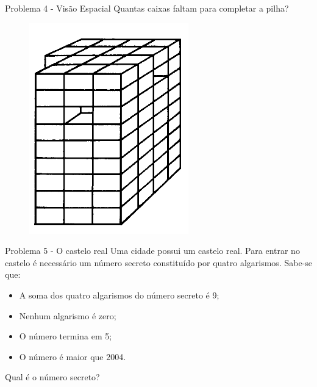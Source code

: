 \documentclass[aspectratio=169,xcolor=dvipsnames]{beamer}
\begin{document}
\begin{frame}{Problema 4 - Visão Espacial}
    Quantas caixas faltam para completar a pilha?

  \begin{figure}[htb!]
    \centering
    \includegraphics[width=.3\linewidth]{images/visao-espacial.png}
  \end{figure}

\end{frame}


\begin{frame}{Problema 5 - O castelo real}
    Uma cidade possui um castelo real. Para entrar no castelo é necessário
    um número secreto constituído por quatro algarismos. Sabe-se que:
    \begin{itemize}

        \item A soma dos quatro algarismos do número secreto é 9;
        \item Nenhum algarismo é zero;
        \item O número termina em 5;
        \item O número é maior que 2004.

    \end{itemize}

    Qual é o número secreto?
\end{frame}

\end{document}
